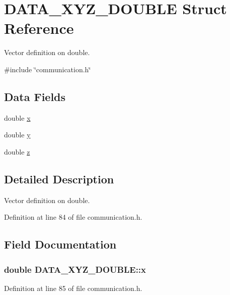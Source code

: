 \hypertarget{structDATA__XYZ__DOUBLE}{
\section{DATA\_\-XYZ\_\-DOUBLE Struct Reference}
\label{structDATA__XYZ__DOUBLE}
}


Vector definition on double.  




{\ttfamily \#include \char`\"{}communication.h\char`\"{}}

\subsection*{Data Fields}
\begin{DoxyCompactItemize}
\item 
double \hyperlink{structDATA__XYZ__DOUBLE_a22868cc99a423900e7b82d015a5eb91f}{x}
\item 
double \hyperlink{structDATA__XYZ__DOUBLE_a198a27b5df3b5b0bf461b0e481e22a82}{y}
\item 
double \hyperlink{structDATA__XYZ__DOUBLE_a9556e8868c223ff3e28756ea18a284c0}{z}
\end{DoxyCompactItemize}


\subsection{Detailed Description}
Vector definition on double. 

Definition at line 84 of file communication.h.



\subsection{Field Documentation}
\hypertarget{structDATA__XYZ__DOUBLE_a22868cc99a423900e7b82d015a5eb91f}{
\subsubsection[{x}]{\setlength{\rightskip}{0pt plus 5cm}double {\bf DATA\_\-XYZ\_\-DOUBLE::x}}}
\label{structDATA__XYZ__DOUBLE_a22868cc99a423900e7b82d015a5eb91f}


Definition at line 85 of file communication.h.



